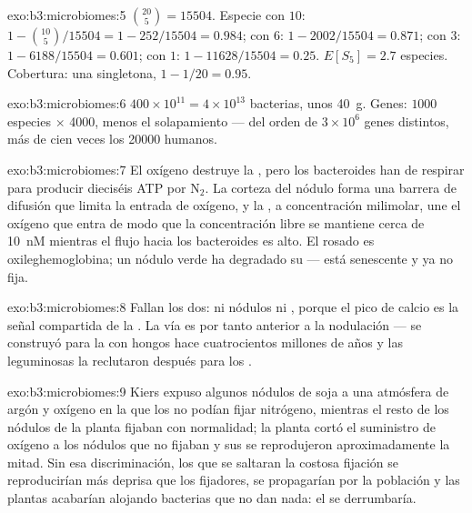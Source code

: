 \begin{solution}{exo:b3:microbiomes:5}
$\binom{20}{5} = \num{15504}$. Especie con $10$: $1 - \binom{10}{5}/
\num{15504} = 1 - 252/\num{15504} = 0.984$; con $6$: $1 - 2002/\num{15504}
= 0.871$; con $3$: $1 - 6188/\num{15504} = 0.601$; con $1$: $1 -
\num{11628}/\num{15504} = 0.25$. $E[S_{5}] = 2.7$ especies. Cobertura: una
singletona, $1 - 1/20 = 0.95$.
\end{solution}

\begin{solution}{exo:b3:microbiomes:6}
$400\times 10^{11} = 4\times 10^{13}$ bacterias, unos \qty{40}{g}. Genes:
$1000$ especies $\times$ \num{4000}, menos el solapamiento --- del orden
de $3\times 10^{6}$ genes distintos, más de cien veces los \num{20000}
humanos.
\end{solution}

\begin{solution}{exo:b3:microbiomes:7}
El oxígeno destruye la , pero los bacteroides han de respirar
para producir dieciséis ATP por N$_{2}$. La corteza del nódulo forma una
barrera de difusión que limita la entrada de oxígeno, y la
, a concentración milimolar, une el oxígeno que entra de
modo que la concentración libre se mantiene cerca de \qty{10}{nM}
mientras el flujo hacia los bacteroides es alto. El rosado es
oxileghemoglobina; un nódulo verde ha degradado su  ---
está senescente y ya no fija.
\end{solution}

\begin{solution}{exo:b3:microbiomes:8}
Fallan los dos: ni nódulos ni , porque el pico de
calcio es la señal compartida de la . La vía es
por tanto anterior a la nodulación --- se construyó para la 
con hongos hace cuatrocientos millones de años y las leguminosas la
reclutaron después para los .
\end{solution}

\begin{solution}{exo:b3:microbiomes:9}
Kiers expuso algunos nódulos de soja a una atmósfera de argón y oxígeno
en la que los  no podían fijar nitrógeno, mientras el resto de
los nódulos de la planta fijaban con normalidad; la planta cortó el
suministro de oxígeno a los nódulos que no fijaban y sus  se
reprodujeron aproximadamente la mitad. Sin esa discriminación, los
 que se saltaran la costosa fijación se reproducirían más deprisa
que los fijadores, se propagarían por la población y las plantas
acabarían alojando bacterias que no dan nada: el  se
derrumbaría.
\end{solution}

